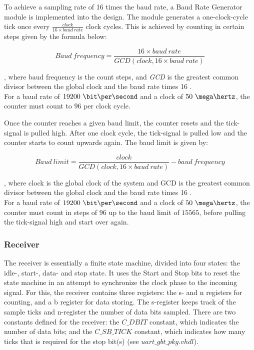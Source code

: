 \documentclass[main.tex]{subfiles}
\begin{document}
To achieve a sampling rate of 16 times the baud rate, a Baud Rate Generator module is implemented into the design. The module generates a one-clock-cycle tick once every $\frac{clock}{16 \times baud\ rate}$ clock cycles. This is achieved by counting in certain steps given by the formula below:

\begin{equation}
Baud\ frequency = \frac{16 \times baud\ rate}{GCD(clock, 16 \times baud\ rate)}
\end{equation}

, where baud frequency is the count steps, and \textit{GCD} is the greatest common divisor between the global clock and the baud rate times 16 \cite{velure10}. \\
For a baud rate of $19200\ \bit\per\second$ and a clock of $50\ \mega\hertz$, the counter must count to $96$ per clock cycle. 

Once the counter reaches a given baud limit, the counter resets and the tick-signal is pulled high. After one clock cycle, the tick-signal is pulled low and the counter starts to count upwards again. The baud limit is given by:

\begin{equation}
Baud\ limit= \frac{clock}{GCD(clock, 16 \times baud\ rate)} - baud\ frequency
\end{equation}

, where clock is the global clock of the system and GCD is the greatest common divisor between the global clock and the baud rate times 16 \cite{velure10}. \\
For a baud rate of $19200\ \bit\per\second$ and a clock of $50\ \mega\hertz$, the counter must count in steps of $96$ up to the baud limit of $15565$, before pulling the tick-signal high and start over again. 

\subsubsection{Receiver}
The receiver is essentially a finite state machine, divided into four states: the idle-, start-, data- and stop state. It uses the Start and Stop bits to reset the state machine in an attempt to synchronize the clock phase to the incoming signal. For this, the receiver contains three registers: the s- and  n registers for counting, and a b register for data storing. The s-register keeps track of the sample ticks and n-register the number of data bits sampled.
There are two constants defined for the receiver: the $C\_DBIT$ constant, which indicates the number of data bits; and the $C\_SB\_TICK$ constant, which indicates how many ticks that is required for the stop bit(s) (see $uart\_gbt\_pkg.vhdl$). 
\end{document}
